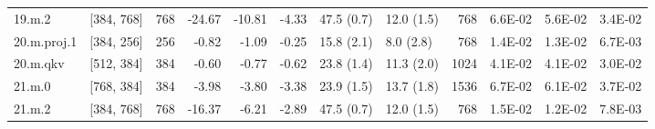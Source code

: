 \begin{table}
\begin{tabular}{llrrrrllrrrr}
19.m.2 & [384, 768] & 768 & {\cellcolor[HTML]{FED481}} \color[HTML]{000000} -24.67 & {\cellcolor[HTML]{FFF8B4}} \color[HTML]{000000} -10.81 & {\cellcolor[HTML]{F5FBB2}} \color[HTML]{000000} -4.33 & 47.5 (0.7) & 12.0 (1.5) & 768 & {\cellcolor[HTML]{FFF3AC}} \color[HTML]{000000} 6.6E-02 & {\cellcolor[HTML]{FFFEBE}} \color[HTML]{000000} 5.6E-02 & {\cellcolor[HTML]{E3F399}} \color[HTML]{000000} 3.4E-02 \\
20.m.proj.1 & [384, 256] & 256 & {\cellcolor[HTML]{ECF7A6}} \color[HTML]{000000} -0.82 & {\cellcolor[HTML]{ECF7A6}} \color[HTML]{000000} -1.09 & {\cellcolor[HTML]{EBF7A3}} \color[HTML]{000000} -0.25 & 15.8 (2.1) & 8.0 (2.8) & 768 & {\cellcolor[HTML]{C3E67D}} \color[HTML]{000000} 1.4E-02 & {\cellcolor[HTML]{C3E67D}} \color[HTML]{000000} 1.3E-02 & {\cellcolor[HTML]{B7E075}} \color[HTML]{000000} 6.7E-03 \\
20.m.qkv & [512, 384] & 384 & {\cellcolor[HTML]{EBF7A3}} \color[HTML]{000000} -0.60 & {\cellcolor[HTML]{ECF7A6}} \color[HTML]{000000} -0.77 & {\cellcolor[HTML]{EBF7A3}} \color[HTML]{000000} -0.62 & 23.8 (1.4) & 11.3 (2.0) & 1024 & {\cellcolor[HTML]{ECF7A6}} \color[HTML]{000000} 4.1E-02 & {\cellcolor[HTML]{ECF7A6}} \color[HTML]{000000} 4.1E-02 & {\cellcolor[HTML]{DDF191}} \color[HTML]{000000} 3.0E-02 \\
21.m.0 & [768, 384] & 384 & {\cellcolor[HTML]{F5FBB2}} \color[HTML]{000000} -3.98 & {\cellcolor[HTML]{F4FAB0}} \color[HTML]{000000} -3.80 & {\cellcolor[HTML]{F2FAAE}} \color[HTML]{000000} -3.38 & 23.9 (1.5) & 13.7 (1.8) & 1536 & {\cellcolor[HTML]{FFF2AA}} \color[HTML]{000000} 6.7E-02 & {\cellcolor[HTML]{FFFAB6}} \color[HTML]{000000} 6.1E-02 & {\cellcolor[HTML]{E8F59F}} \color[HTML]{000000} 3.7E-02 \\
21.m.2 & [384, 768] & 768 & {\cellcolor[HTML]{FEEB9D}} \color[HTML]{000000} -16.37 & {\cellcolor[HTML]{FBFDBA}} \color[HTML]{000000} -6.21 & {\cellcolor[HTML]{F1F9AC}} \color[HTML]{000000} -2.89 & 47.5 (0.7) & 12.0 (1.5) & 768 & {\cellcolor[HTML]{C5E67E}} \color[HTML]{000000} 1.5E-02 & {\cellcolor[HTML]{BFE47A}} \color[HTML]{000000} 1.2E-02 & {\cellcolor[HTML]{B9E176}} \color[HTML]{000000} 7.8E-03 \\
\bottomrule
\end{tabular}
\end{table}
